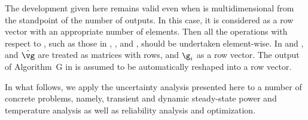 \begin{remark} 
The development given here remains valid even when \g is multidimensional from
the standpoint of the number of outputs. In this case, it is considered as a row
vector with an appropriate number of elements. Then all the operations with
respect to \g, such as those in ,
, and , should be undertaken
element-wise. In  and , \vg
and $\hat{\vg}$ are treated as matrices with \nc rows, and $\g_i$ as a row
vector. The output of Algorithm~G in  is assumed to be
automatically reshaped into a row vector.
\end{remark}

In what follows, we apply the uncertainty analysis presented here to a number of
concrete problems, namely, transient and dynamic steady-state power and
temperature analysis as well as reliability analysis and optimization.
